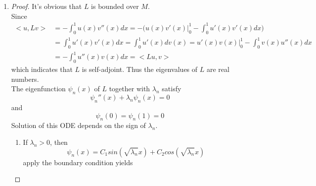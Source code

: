 \documentclass[paper=a4, fontsize=11pt]{scrartcl} %
\numberwithin{equation}{section} %
\numberwithin{figure}{section} %
\numberwithin{table}{section} %
\begin{document}
\begin{enumerate}
\begin{proof}
\begin{equation}
					Lu = \lambda u
				\end{equation}
				Thus
				\begin{equation}
					u = \frac{1}{\lambda} Lu
				\end{equation}
				As $K = L^{-1}$ is known, take the operator $K$ onto it yields
				\begin{equation}
					Ku = \frac{1}{\lambda}KLu = \frac{1}{\lambda} Iu = \frac{1}{\lambda} u
				\end{equation}
				which indicates that $\frac{1}{\lambda}$ is an eigenvalue of $K$.\\
				It's clear that for the given $\lambda$, $K$ and $L$ share the same eigenfunction $u(x)$.
			\end{proof}
		\item 
			\begin{proof}
				It's obvious that $L$ is bounded over $M$.\\
				Since
				\begin{equation}
					\begin{aligned}
						<u, Lv> &= -\int_{0}^{1} u(x)v''(x) dx = -\Bigg(u(x)v'(x)\Big|_0^1 - \int_{0}^{1}u'(x)v'(x)dx\Bigg)\\
								&= \int_{0}^{1}u'(x)v'(x)dx = \int_{0}^{1}u'(x)dv(x) = u'(x)v(x)\Big|_0^1 - \int_{0}^{1} v(x)u''(x)dx\\
								& = -\int_{0}^{1} u''(x)v(x)dx = <Lu, v>
					\end{aligned}
				\end{equation}
				which indicates that $L$ is self-adjoint. Thus the eigenvalues of $L$ are real numbers.\\
		 		The eigenfunction $\psi_n(x)$ of $L$ together with $\lambda_n$ satisfy 
		 		\begin{equation}
		 			\psi_n''(x) + \lambda_n \psi_n(x) = 0
		 		\end{equation}
		 		and
		 		\begin{equation}
		 			\psi_n(0) = \psi_n(1) = 0
		 		\end{equation}
		 		Solution of this ODE depends on the sign of $\lambda_n$.\\
		 		\begin{enumerate}
		 			\item 
		 				If $\lambda_n > 0$, then
		 				\begin{equation}
		 					\psi_n(x) = C_1 sin(\sqrt{\lambda_n}x) + C_2 cos(\sqrt{\lambda_n}x)
		 				\end{equation}
		 				apply the boundary condition yields
		 				\begin{equation}

\end{equation}
\end{enumerate}
\end{proof}
\end{enumerate}
\end{document}
